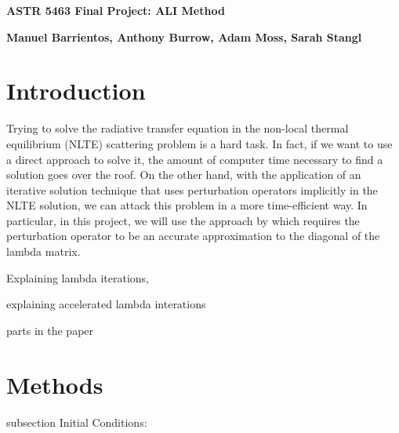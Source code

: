 \documentclass[12pt]{article}
\begin{document}
\begin{center}\begin{LARGE}
\textbf{ASTR 5463 Final Project: ALI Method}
\end{LARGE}\end{center}

\begin{center}
\textbf{Manuel Barrientos, Anthony Burrow, Adam Moss, Sarah Stangl}
\end{center}

\section{Introduction}

Trying to solve the radiative transfer equation in the non-local thermal equilibrium (NLTE) scattering problem is a hard task. In fact, if we want to use a direct approach to solve it, the amount of computer time necessary to find a solution goes over the roof. On the other hand, with the application of an iterative solution technique that uses perturbation operators implicitly in the NLTE solution, we can attack this problem in a more time-efficient way. In particular, in this project, we will use the approach by \citep{OandK1987} which requires the perturbation operator to be an accurate approximation to the diagonal of the lambda matrix.


Explaining lambda iterations,

explaining accelerated lambda interations

parts in the paper

\section{Methods}

subsection
Initial Conditions:
\end{document}
